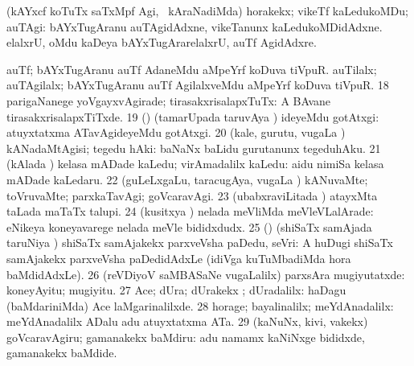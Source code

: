 {{ (kAYxcf koTuTx saTxMpf Agi, \mo\ kAraNadiMda) horakekx;
vikeTf kaLedukoMDu; auTAgi:  bAYxTugAranu
auTAgidAdxne, vikeTanunx kaLedukoMDidAdxne.  elalxrU, oMdu
kaDeya bAYxTugArarelalxrU, auTf AgidAdxre.

 auTf; bAYxTugAranu auTf AdaneMdu aMpeYrf koDuva
tiVpuR.  auTilalx; auTAgilalx; bAYxTugAranu auTf
AgilalxveMdu aMpeYrf koDuva tiVpuR.
\num{18} parigaNanege yoVgayxvAgirade; tirasakxrisalapxTuTx:  A BAvane tirasakxrisalapxTiTxde.
\num{19} (\AmA) (tamarUpada taruvAya \parx) ideyeMdu gotAtxgi:
 atuyxtatxma ATavAgideyeMdu gotAtxgi.
\num{20} (kale, gurutu, \mo vugaLa \vi) kANadaMtAgisi; tegedu hAki:
 baNaNx baLidu gurutanunx tegeduhAku.
\num{21} (kAlada \vi) kelasa mADade kaLedu; virAmadalilx kaLedu:
 aidu nimiSa kelasa mADade kaLedaru.
\num{22} (guLeLxgaLu, taracugAya, \mo vugaLa \vi) kANuvaMte;
toVruvaMte; parxkaTavAgi; goVcaravAgi. 
\num{23} (ubabxraviLitada \vi) atayxMta taLada maTaTx talupi.
\num{24} (kusitxya \vi) nelada meVliMda meVleVLalArade:  eNikeya koneyavarege nelada meVle bididxdudx.
\num{25} (\pArxparx) (shiSaTx samAjada taruNiya \vi) shiSaTx
samAjakekx parxveVsha paDedu, seVri:  A huDugi
shiSaTx samAjakekx parxveVsha paDedidAdxLe (idiVga kuTuMbadiMda hora
baMdidAdxLe).
\num{26} (reVDiyoV saMBASaNe \mo vugaLalilx) parxsAra mugiyutatxde:  koneyAyitu;
mugiyitu.
\num{27} Ace; dUra; dUrakekx ; dUradalilx:  haDagu (baMdariniMda) Ace laMgarinalilxde.
\num{28} horage; bayalinalilx; meYdAnadalilx:  meYdAnadalilx ADalu adu atuyxtatxma ATa.
\num{29} (kaNuNx, kivi, \mo vakekx) goVcaravAgiru; gamanakekx baMdiru:
 adu namamx kaNiNxge bididxde,
gamanakekx baMdide.}}

